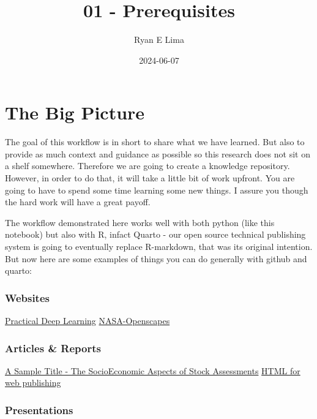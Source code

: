 \documentclass[
  letterpaper,
  DIV=11,
  numbers=noendperiod]{scrartcl}
\title{01 - Prerequisites}
\author{Ryan E Lima}
\date{2024-06-07}
\renewcommand*\contentsname{Table of contents}
\newcommand\contentsname{Table of contents}
\begin{document}
\maketitle

\renewcommand*\contentsname{Table of contents}
{
\hypersetup{linkcolor=}
\setcounter{tocdepth}{3}
\tableofcontents
}
\section{The Big Picture}\label{the-big-picture}

The goal of this workflow is in short to share what we have learned. But
also to provide as much context and guidance as possible so this
research does not sit on a shelf somewhere. Therefore we are going to
create a knowledge repository. However, in order to do that, it will
take a little bit of work upfront. You are going to have to spend some
time learning some new things. I assure you though the hard work will
have a great payoff.

The workflow demonstrated here works well with both python (like this
notebook) but also with R, infact Quarto - our open source technical
publishing system is going to eventually replace R-markdown, that was
its original intention. But now here are some examples of things you can
do generally with github and quarto:

\subsubsection{Websites}\label{websites}

\href{https://course.fast.ai/}{Practical Deep Learning}
\href{https://nasa-openscapes.github.io/}{NASA-Openscapes}

\subsubsection{Articles \& Reports}\label{articles-reports}

\href{https://github.com/nmfs-opensci/quarto_titlepages/blob/main/example_1.pdf}{A
Sample Title - The SocioEconomic Aspects of Stock Assessments}
\href{https://quarto-dev.github.io/quarto-gallery/articles/html/html.html}{HTML
for web publishing}

\subsubsection{Presentations}\label{presentations}
\end{document}
